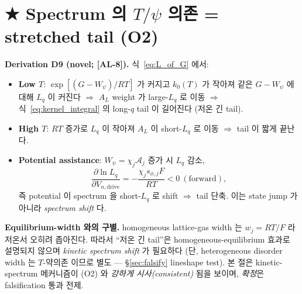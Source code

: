 \documentclass[11pt,a4paper]{article}
\newcommand{\dimedrive}{\mathrm{drive}}
\newcommand{\AL}[1]{\textsf{[AL-#1]}}
\begin{document}
\section{★ Spectrum 의 $T/\psi$ 의존 = stretched tail (O2)}\label{sec:tailT}
\textbf{Derivation D9 (novel; \AL{8}).} 식~\eqref{eq:L_of_G} 에서:
\begin{itemize}
\item \textbf{Low $T$}: $\exp[(G-W_\psi)/RT]$ 가 커지고 $k_0(T)$ 가 작아져 같은 $G-W_\psi$
  에 대해 $L_q$ 이 커진다 $\Rightarrow$ $A_L$ weight 가 large-$L_q$ 로 이동 $\Rightarrow$
  식~\eqref{eq:kernel_integral} 의 long-$q$ tail 이 길어진다 (저온 긴 tail).
\item \textbf{High $T$}: $RT$ 증가로 $L_q$ 이 작아져 $A_L$ 이 short-$L_q$ 로 이동 $\Rightarrow$
  tail 이 짧게 끝난다.
\item \textbf{Potential assistance}: $W_\psi=\chi_j\mathcal A_j$ 증가 시 $L_q$ 감소,
  \begin{equation}
  \frac{\partial\ln L_q}{\partial V_{n,\dimedrive}}=-\frac{\chi_j s_{\phi,j}F}{RT}<0\ (\text{forward}),
  \label{eq:psi_shift}
  \end{equation}
  즉 potential 이 spectrum 을 short-$L_q$ 로 shift $\Rightarrow$ tail 단축. 이는 state jump
  가 아니라 \emph{spectrum shift} 다.
\end{itemize}
\textbf{Equilibrium-width 와의 구별.} homogeneous lattice-gas width 는 $w_j=RT/F$ 라 저온서
오히려 좁아진다. 따라서 ``저온 긴 tail''은 homogeneous-equilibrium 효과로 설명되지 않으며
\emph{kinetic spectrum shift} 가 필요하다 (단, heterogeneous disorder width 는 $T$-약의존
이므로 별도 — \S\ref{sec:falsify} lineshape test). 본 절은 kinetic-spectrum 메커니즘이
(O2) 와 \emph{강하게 시사(consistent)} 됨을 보이며, \emph{확정}은 falsification 통과 전제.

\end{document}
